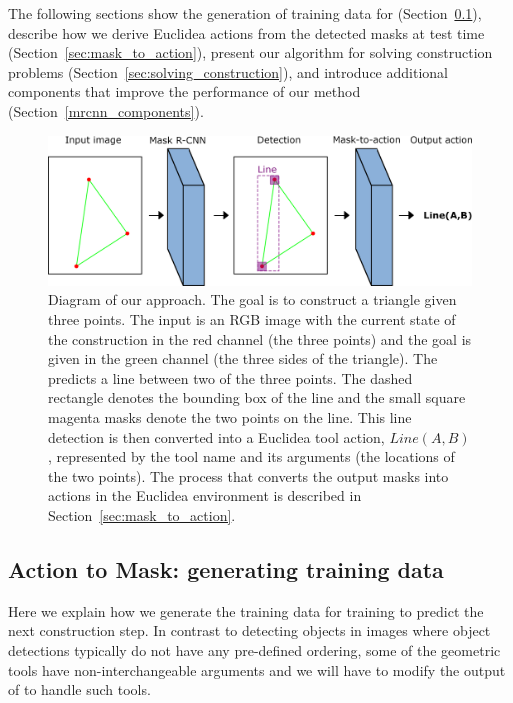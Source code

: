The following sections show the generation of training data for \maskrcnn (Section~\ref{sec:action_to_mask}), describe how we derive Euclidea actions from the detected masks at test time (Section~\ref{sec:mask_to_action}), present our algorithm for solving construction problems (Section~\ref{sec:solving_construction}), and introduce additional components that improve the performance of our method (Section~\ref{mrcnn_components}).

\begin{figure}[tbp]
\centering
\includegraphics[width=\textwidth]{img/approach_schema_v2.png}
\caption{Diagram of our approach.
The goal is to construct a triangle given three points.
The input is an RGB image with the current state of the construction in the red channel (the three points) and the goal is given in the green channel (the three sides of the triangle).
The \maskrcnn predicts a line between two of the three points.
The dashed rectangle denotes the bounding box of the line and the small square magenta masks denote the two points on the line.
This \maskrcnn line detection is then converted into a Euclidea tool action, $Line(A, B)$, represented by the tool name and its arguments (the locations of the two points).
The process that converts the \maskrcnn output masks into actions in the Euclidea environment is described in Section~\ref{sec:mask_to_action}.}
\label{our_approach_schema}
\vspace*{-1.5em}
\end{figure}

\subsection{Action to Mask: generating training data}
\label{sec:action_to_mask}
Here we explain how we generate the training data for training \maskrcnn to predict the next construction step. In contrast to detecting objects in images where object detections typically do not have any pre-defined ordering, some of the geometric tools have non-interchangeable arguments and we will have to modify the output of \maskrcnn to handle such tools.

